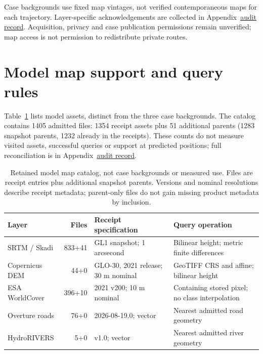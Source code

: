 Case backgrounds use fixed map vintages, not verified contemporaneous
maps for each trajectory. Layer-specific acknowledgements are collected in
Appendix~\href{audit-notes.pdf\#sec:source-reconciliation-details}{audit record}. Acquisition, privacy and
case publication permissions remain unverified; map access is not permission
to redistribute private routes.


\section{Model map support and query rules}
\label{sec:model-map-support}\hypertarget{sec:model-map-support}{}
Table~\ref{tab:model-map-catalog} lists model assets, distinct from the three
case backgrounds. The catalog contains 1405 admitted files: 1354 receipt
assets plus 51 additional parents (1283 snapshot parents, 1232 already in the
receipts). These counts do not measure visited assets, successful queries or
support at predicted positions; full reconciliation is in
Appendix~\href{audit-notes.pdf\#sec:source-reconciliation-details}{audit record}.

\begin{table}[htbp]
\centering\footnotesize
\caption{Retained model map catalog, not case backgrounds or measured use.
Files are receipt entries plus additional snapshot parents. Versions and
nominal resolutions describe receipt metadata; parent-only files do not gain
missing product metadata by inclusion.}
\label{tab:model-map-catalog}\hypertarget{tab:model-map-catalog}{}
\begin{tabular}{@{}p{.24\linewidth}rp{.23\linewidth}p{.32\linewidth}@{}}
\toprule
Layer & Files & Receipt specification & Query operation\\
\midrule
SRTM / Skadi & 833+41 & GL1 snapshot; 1 arcsecond & Bilinear height; metric finite differences\\
Copernicus DEM & 44+0 & GLO-30, 2021 release; 30 m nominal & GeoTIFF CRS and affine; bilinear height\\
ESA WorldCover & 396+10 & 2021 v200; 10 m nominal & Containing stored pixel; no class interpolation\\
Overture roads & 76+0 & 2026-08-19.0; vector & Nearest admitted road geometry\\
HydroRIVERS & 5+0 & v1.0; vector & Nearest admitted river geometry\\
\bottomrule
\end{tabular}
\end{table}

